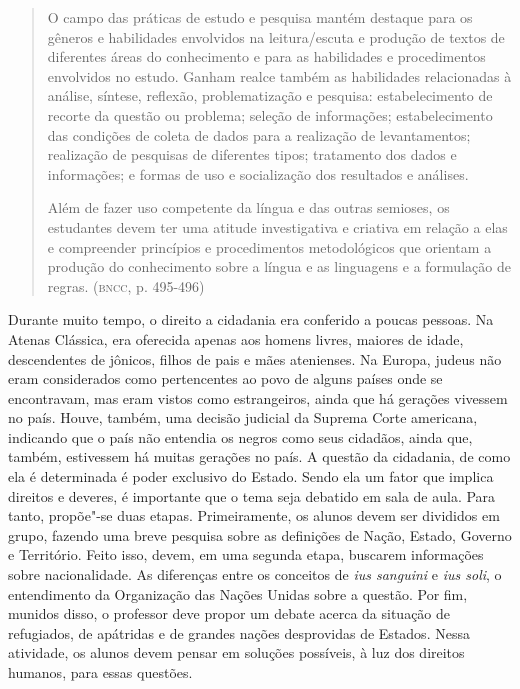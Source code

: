 \documentclass[12pt]{extarticle}
\begin{document}
\begin{quote}
O campo das práticas de estudo e pesquisa mantém destaque para os
gêneros e habilidades envolvidos na leitura/escuta e produção de textos
de diferentes áreas do conhecimento e para as habilidades e
procedimentos envolvidos no estudo. Ganham realce também as habilidades
relacionadas à análise, síntese, reflexão, problematização e pesquisa:
estabelecimento de recorte da questão ou problema; seleção de
informações; estabelecimento das condições de coleta de dados para a
realização de levantamentos; realização de pesquisas de diferentes
tipos; tratamento dos dados e informações; e formas de uso e
socialização dos resultados e análises.

Além de fazer uso competente da língua e das outras semioses, os
estudantes devem ter uma atitude investigativa e criativa em relação a
elas e compreender princípios e procedimentos metodológicos que orientam
a produção do conhecimento sobre a língua e as linguagens e a formulação
de regras. (\textsc{bncc}, p. 495-496)
\end{quote}

Durante muito tempo, o direito a cidadania era conferido a poucas
pessoas. Na Atenas Clássica, era oferecida apenas aos homens livres,
maiores de idade, descendentes de jônicos, filhos de pais e mães
atenienses. Na Europa, judeus não eram considerados como pertencentes
ao povo de alguns países onde se encontravam, mas eram vistos como
estrangeiros, ainda que há gerações vivessem no país. Houve, também,
uma decisão judicial da Suprema Corte americana, indicando que o país
não entendia os negros como seus cidadãos, ainda que, também,
estivessem há muitas gerações no país. A questão da cidadania, de como
ela é determinada é poder exclusivo do Estado. Sendo ela um fator que
implica direitos e deveres, é importante que o tema seja debatido em
sala de aula. Para tanto, propõe"-se duas etapas. Primeiramente, os
alunos devem ser divididos em grupo, fazendo uma breve pesquisa sobre
as definições de Nação, Estado, Governo e Território. Feito isso,
devem, em uma segunda etapa, buscarem informações sobre nacionalidade.
As diferenças entre os conceitos de \emph{ius sanguini} e \emph{ius
soli}, o entendimento da Organização das Nações Unidas sobre a
questão. Por fim, munidos disso, o professor deve propor um debate
acerca da situação de refugiados, de apátridas e de grandes nações
desprovidas de Estados. Nessa atividade, os alunos devem pensar em
soluções possíveis, à luz dos direitos humanos, para essas questões.
\end{document}
